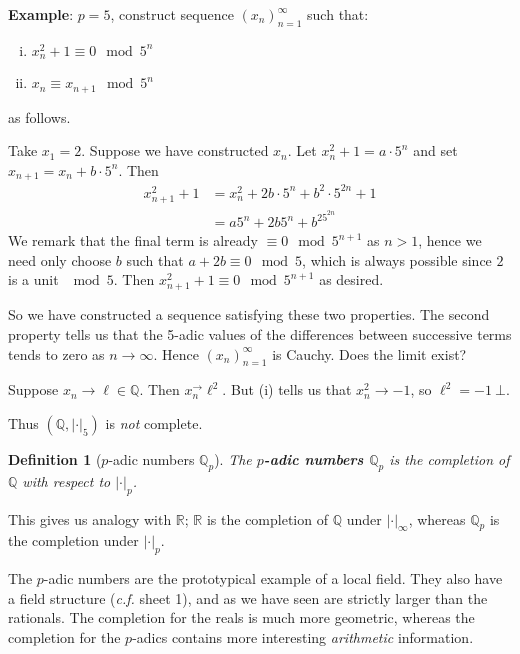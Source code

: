 \documentclass[]{article}
\theoremstyle{custhm}
\theoremstyle{cusdef}
\newtheorem{defin}[theorem]{Definition}
\theoremstyle{custhm}
\theoremstyle{custhm}
\theoremstyle{custhm}
\theoremstyle{cusdef}
\theoremstyle{remark}
\newcommand{\Q}{\mathbb{Q}}
\newcommand{\R}{\mathbb{R}}
\newcommand{\ra}{\rightarrow}
\newcommand{\undf}[1]{\textit{\textbf{#1}}}
\renewcommand{\it}[1]{\textit{#1}}
\begin{document}
\textbf{Example}: $p = 5$, construct sequence $(x_n)_{n=1}^{\infty}$ such that:
\begin{enumerate}[(i)]
	\item $x_n^2 + 1 \equiv 0 \mod 5^n$
	\item $x_n \equiv x_{n+1} \mod 5^n$
\end{enumerate}
as follows.

Take $x_1 = 2$. Suppose we have constructed $x_n$. Let $x_n^2 + 1 = a\cdot5^n$ and set $x_{n+1} = x_n + b\cdot5^n$. Then
\begin{align*}
	x_{n+1}^2 + 1 &= x_n^2 + 2b\cdot5^n + b^2\cdot5^{2n} + 1\\
	&=a5^n + 2b5^n + b^25^{2n}
\end{align*}
We remark that the final term is already $\equiv 0 \mod 5^{n+1}$ as $n > 1$, hence we need only choose $b$ such that $a + 2b \equiv 0\mod 5$, which is always possible since $2$ is a unit $\mod 5$. Then $x_{n+1}^2 + 1 \equiv 0 \mod 5^{n+1}$ as desired.

So we have constructed a sequence satisfying these two properties. The second property tells us that the 5-adic values of the differences between successive terms tends to zero as $n\ra\infty$. Hence $(x_n)_{n=1}^{\infty}$ is Cauchy. Does the limit exist?

Suppose $x_n\ra \ell\in\Q$. Then $x_n^\ra\ell^2$. But (i) tells us that $x_n^2\ra-1$, so $\ell^2 = -1\ \bot$.

Thus $(\Q,|\cdot|_5)$ is \it{not} complete.

\begin{defin}[$p$-adic numbers $\Q_p$]
The \undf{$p$-adic numbers $\Q_p$} is the completion of $\Q$ with respect to $|\cdot|_p$.
\end{defin}

This gives us analogy with $\R$; $\R$ is the completion of $\Q$ under $|\cdot|_{\infty}$, whereas $\Q_p$ is the completion under $|\cdot|_p$.

The $p$-adic numbers are the prototypical example of a local field. They also have a field structure (\it{c.f.} sheet 1), and as we have seen are strictly larger than the rationals. The completion for the reals is much more geometric, whereas the completion for the $p$-adics contains more interesting \it{arithmetic} information.
\end{document}
